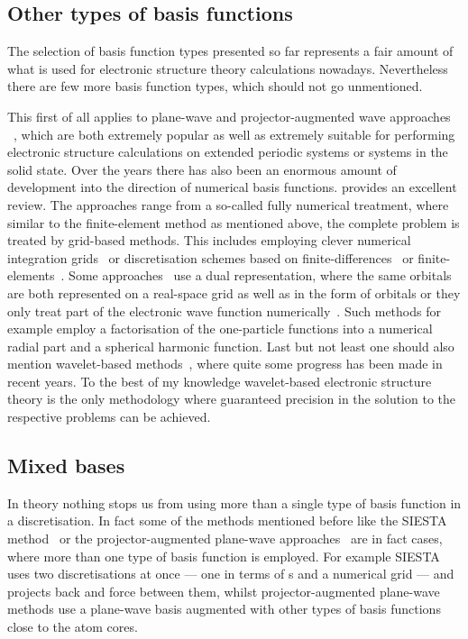 




\subsection{Other types of basis functions}
The selection of basis function types presented so far
represents a fair amount of what is used for electronic structure theory
calculations nowadays.
Nevertheless there are few more basis function types,
which should not go unmentioned.

This first of all applies to
plane-wave and projector-augmented wave approaches
~\cite{Kresse1996,Kresse1999,Mortensen2005,Enkovaara2010},
which are both extremely popular as well as extremely suitable for performing
electronic structure calculations
on extended periodic systems or systems in the solid state.
Over the years there has also been an enormous amount of development
into the direction of numerical basis functions.
\citet{Frediani2015} provides an excellent review.
The approaches range from a so-called fully numerical treatment,
where similar to the finite-element method as mentioned above,
the complete problem is treated by grid-based methods.
This includes employing clever
numerical integration grids~\cite{Losilla2012DCRsp,Toivanen2015,Enkovaara2010}
or discretisation schemes
based on finite-differences~\cite{Kobus2013}
or finite-elements~\cite{Tsuchida1995,Briggs1996,Pask05,Lehtovaara2009,Alizadegan2010,Avery2011PhD,Davydov2015,Boffi2016}.
Some approaches~\cite{Soler2002} use a dual representation,
where the same orbitals are both represented on a real-space grid
as well as in the form of orbitals
or they only treat
part of the electronic wave function numerically~\cite{Fischer1978,LUCAS}.
Such methods for example employ a factorisation of the one-particle functions
into a numerical radial part and a spherical harmonic function.
Last but not least one should also mention
wavelet-based methods~\cite{Bischoff2011,Bischoff2012,Bischoff2013,Bischoff2014,Bischoff2014a,Bischoff2017},
where quite some progress has been made in recent years.
To the best of my knowledge wavelet-based electronic structure theory
is the only methodology where guaranteed precision in the solution to the
respective problems can be achieved.

\subsection{Mixed bases}
In theory nothing stops us from using more than a single type of basis function
in a discretisation.
In fact some of the methods mentioned before like
the SIESTA method~\cite{Soler2002} or the projector-augmented
plane-wave approaches~\cite{Kresse1996,Kresse1999,Mortensen2005,Enkovaara2010}
are in fact cases, where more than one type of basis function is employed.
For example SIESTA uses two discretisations at once
--- one in terms of {\cGTO}s and a numerical grid ---
and projects back and force between them,
whilst projector-augmented plane-wave methods use a plane-wave basis
augmented with other types of basis functions close to the atom cores.

